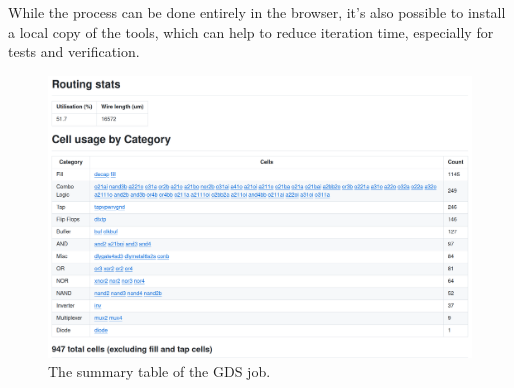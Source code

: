 
While the process can be done entirely in the browser, it’s also possible to install a local copy of the tools, which can help to reduce iteration time, especially for tests and verification.

\begin{figure}[htp]
\centering
\includegraphics[width=\columnwidth]{./Figs/gh action cell stats.png}
\caption{The summary table of the GDS job.}
\label{fig:summary_table_GDS_job}
\end{figure}

